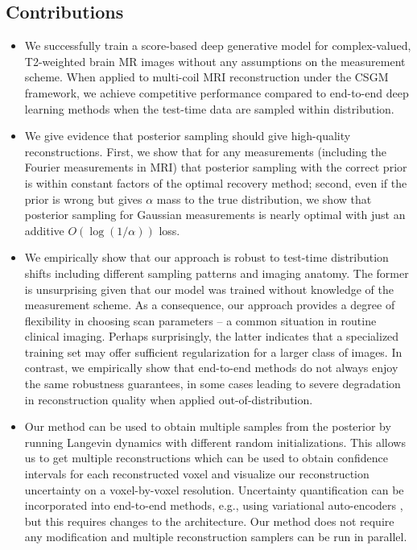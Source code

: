 \documentclass{article}
\begin{document}
\subsection{Contributions}
\begin{itemize}[leftmargin = *]

    \item We successfully train a score-based deep generative model
        for complex-valued, T2-weighted brain MR images without any
        assumptions on the measurement scheme. When applied to
        multi-coil MRI reconstruction under the CSGM framework, we
        achieve competitive performance compared to end-to-end deep
        learning methods when the test-time data are sampled within
        distribution.
    \item We give evidence that posterior sampling should give
        high-quality reconstructions.  First, we show that for any
        measurements (including the Fourier measurements in MRI) that
        posterior sampling with the correct prior is within constant
        factors of the optimal recovery method; second, even if the
        prior is wrong but gives $\alpha$ mass to the true
        distribution, we show that posterior sampling for Gaussian
        measurements is nearly optimal with just an additive
        $O(\log(1/\alpha))$ loss.
    \item We empirically show that our approach is robust to test-time
        distribution shifts including different sampling patterns and
        imaging anatomy.  The former is unsurprising given that our
        model was trained without knowledge of the measurement scheme.
        As a consequence, our approach provides a degree of
        flexibility in choosing scan parameters -- a common situation
        in routine clinical imaging. Perhaps surprisingly, the latter
        indicates that a specialized training set may offer sufficient
        regularization for a larger class of images.  In contrast, we
        empirically show that end-to-end methods do not always enjoy
        the same robustness guarantees, in some cases leading to
        severe degradation in reconstruction quality when applied
        out-of-distribution. 
    \item Our method can be used to obtain multiple samples from the
        posterior by running Langevin dynamics with different random
        initializations. This allows us to get multiple
        reconstructions which can be used to obtain confidence
        intervals for each reconstructed voxel and visualize our
        reconstruction uncertainty on a voxel-by-voxel resolution.
        Uncertainty quantification can be incorporated into end-to-end
        methods, e.g., using variational auto-encoders
        \cite{mardani2021mriuncertainty}, but this requires changes to
        the architecture. Our method does not require any modification
        and multiple reconstruction samplers can be run in parallel.
\end{itemize}
        
\end{document}
